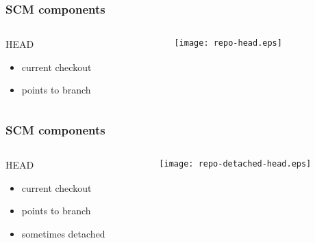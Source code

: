 \documentclass[english]{beamer}
\begin{document}
\begin{frame}
\frametitle{SCM components}
\begin{columns}[t]
        \begin{column}[T]{.5\textwidth}
                HEAD
                \begin{itemize}
                        \item current checkout
                        \item points to branch
                \end{itemize}
        \end{column}
        \begin{column}[T]{.5\textwidth}
                \vspace{.2\textheight}
                \texttt{[image: repo-head.eps]}
        \end{column}
\end{columns}

\end{frame}

\begin{frame}
\frametitle{SCM components}
\begin{columns}[t]
        \begin{column}[T]{.5\textwidth}
                HEAD
                \begin{itemize}
                        \item current checkout
                        \item points to branch
                        \item sometimes detached
                \end{itemize}
        \end{column}
        \begin{column}[T]{.5\textwidth}
                \vspace{.2\textheight}
                \texttt{[image: repo-detached-head.eps]}
        \end{column}
\end{columns}

\end{frame}
\end{document}
